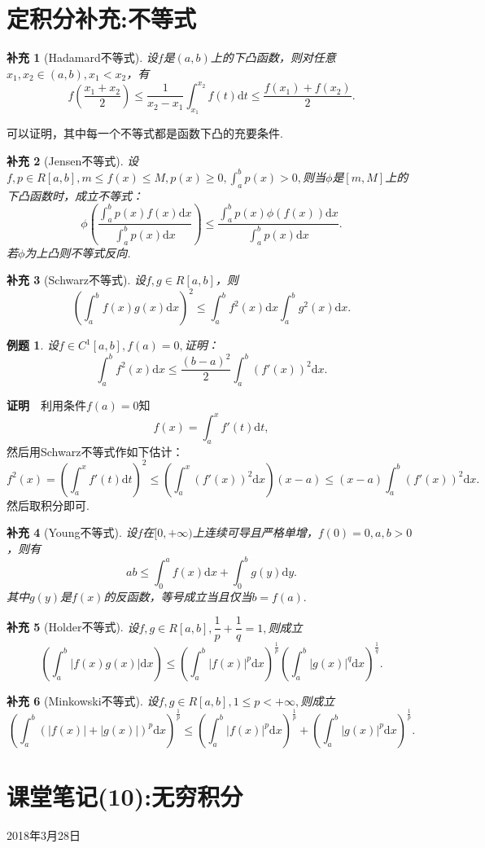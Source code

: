 \documentclass[UTF8]{article}
\newcommand{\dx}{\mathrm{d}x}
\newcommand{\zm}{\textbf{证明}$\quad$}
\newtheorem{add}{\hspace{2em}补充}[section]
\newtheorem{exa}{\hspace{2em}例题}[section]
\begin{document}
\section{定积分补充:不等式}
\begin{add}[Hadamard不等式]
  设$f$是$(a,b)$上的下凸函数，则对任意$x_1,x_2\in(a,b),x_1<x_2$，有
  $$f\left(\frac{x_1+x_2}{2}\right)\le\frac{1}{x_2-x_1}\int_{x_1}^{x_2}f(t)\mathrm{d}t
  \le\frac{f(x_1)+f(x_2)}{2}.$$
\end{add}
可以证明，其中每一个不等式都是函数下凸的充要条件.
\begin{add}[Jensen不等式]
  设$f,p\in R[a,b],m\le f(x)\le M,p(x)\ge0,\int_a^bp(x)>0,$则当$\phi$是$[m,M]$上的下凸函数时，成立不等式：
  $$\phi\left(\frac{\int_a^bp(x)f(x)\dx}{\int_a^bp(x)\dx}\right)\le \frac{\int_a^bp(x)\phi(f(x))\dx}
  {\int_a^bp(x)\dx}.$$
  若$\phi$为上凸则不等式反向.
\end{add}
\begin{add}[Schwarz不等式]
  设$f,g\in R[a,b]$，则
  $$\left(\int_a^bf(x)g(x)\dx\right)^2\le\int_a^bf^2(x)\dx\int_a^bg^2(x)\dx.$$
\end{add}
\begin{exa}
  设$f\in C^1[a,b],f(a)=0,$证明：
  $$\int_a^bf^2(x)\dx\le\frac{(b-a)^2}{2}\int_a^b(f'(x))^2\dx.$$
\end{exa}
\zm 利用条件$f(a)=0$知
$$f(x)=\int_a^xf'(t)\mathrm{d}t,$$
然后用Schwarz不等式作如下估计：
$$f^2(x)=\left(\int_a^xf'(t)\mathrm{d}t\right)^2\le\left(\int_a^x(f'(x))^2\dx\right)(x-a)
\le(x-a)\int_a^b(f'(x))^2\dx.$$然后取积分即可.
\begin{add}[Young不等式]
  设$f$在$[0,+\infty)$上连续可导且严格单增，$f(0)=0,a,b>0$，则有
  $$ab\le\int_0^af(x)\dx+\int_0^bg(y)\mathrm{d}y.$$其中$g(y)$是$f(x)$的反函数，等号成立当且仅当$b=f(a).$
\end{add}
\begin{add}[Holder不等式]
  设$f,g\in R[a,b],\dfrac{1}{p}+\dfrac{1}{q}=1,$则成立
  $$\left(\int_a^b|f(x)g(x)|\dx\right)\le\left(\int_a^b|f(x)|^p\dx\right)^\frac{1}{p}
  \left(\int_a^b|g(x)|^q\dx\right)^\frac{1}{q}.$$
\end{add}
\begin{add}[Minkowski不等式]
  设$f,g\in R[a,b],1\le p<+\infty,$则成立
  $$\left(\int_a^b(|f(x)|+|g(x)|)^p\dx\right)^\frac{1}{p}\le\left(\int_a^b|f(x)|^p\dx\right)^\frac{1}{p}+
  \left(\int_a^b|g(x)|^p\dx\right)^\frac{1}{p}.$$
\end{add}

\clearpage
\section{课堂笔记(10):无穷积分}
\begin{center}
  2018年3月28日
\end{center}
\end{document}
